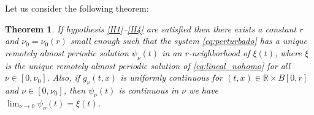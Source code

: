 \documentclass[english,reqno]{amsart}
\numberwithin{equation}{section}
\theoremstyle{plain}
\newtheorem{thm}{Theorem}[section]
\theoremstyle{definition}
\theoremstyle{remark}
\begin{document}
Let us consider the following theorem:

\begin{thm} \label{teorema 8}
If hypothesis \ref{H1}--\ref{H4} are satisfied then there exists a constant $r$ and $\nu_{0}=\nu_{0}\left(r\right)$ small enough such that the system \eqref{eq:perturbado} has a unique remotely almost periodic solution $\psi_{\nu}\left(t\right)$ in an $r$-neighborhood of $\xi\left(t\right)$, where $\xi$ is the unique remotely almost periodic solution of \eqref{eq:lineal_nohomo} for all $\nu\in\left[0,\nu_{0}\right]$.
Also, if $g_{\nu}\left(t,x\right)$ is uniformly continuous for
$\left(t,x\right)\in\mathbb{R}\times B\left[0,r\right]\,$ and $\nu\in\left[0,\nu_{0}\right]$, then $\psi_{\nu}\left(t\right)$ is continuous in $\nu$ we have $\lim_{\nu\rightarrow0}\psi_{\nu}\left(t\right)=\xi(t)$.
\end{thm}
\end{document}
